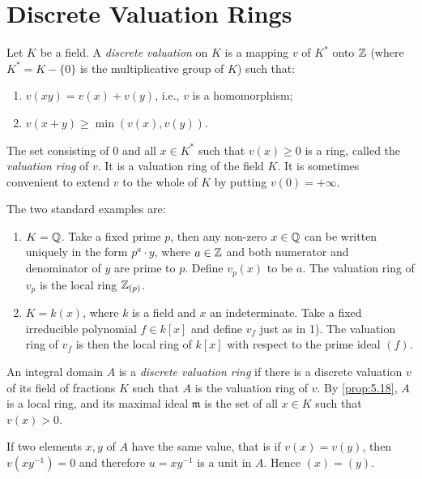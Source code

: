 \section*{Discrete Valuation Rings}
Let $K$ be a field. A \emph{discrete valuation} on $K$ is a mapping $v$ of $K^*$ onto $\mathbb{Z}$ (where $K^* = K - \{0\}$ is the multiplicative group of $K$) such that:
\begin{enumerate}[1)]
    \item $v(xy) = v(x) + v(y)$, i.e., $v$ is a homomorphism;
    \item $v(x + y) \geq \min(v(x), v(y))$.
\end{enumerate}

The set consisting of $0$ and all $x \in K^*$ such that $v(x) \geq 0$ is a ring, called the \emph{valuation ring} of $v$. It is a valuation ring of the field $K$. It is sometimes convenient to extend $v$ to the whole of $K$ by putting $v(0) = +\infty$.

\begin{examples}
The two standard examples are:
\begin{enumerate}[1)]
    \item $K = \mathbb{Q}$. Take a fixed prime $p$, then any non-zero $x \in \mathbb{Q}$ can be written uniquely in the form $p^a \cdot y$, where $a \in \mathbb{Z}$ and both numerator and denominator of $y$ are prime to $p$. Define $v_p(x)$ to be $a$. The valuation ring of $v_p$ is the local ring $\mathbb{Z}_{(p)}$.
    
    \item $K = k(x)$, where $k$ is a field and $x$ an indeterminate. Take a fixed irreducible polynomial $f \in k[x]$ and define $v_f$ just as in 1). The valuation ring of $v_f$ is then the local ring of $k[x]$ with respect to the prime ideal $(f)$.
\end{enumerate}
\end{examples}

An integral domain $A$ is a \emph{discrete valuation ring} if there is a discrete valuation $v$ of its field of fractions $K$ such that $A$ is the valuation ring of $v$. By \eqref{prop:5.18}, $A$ is a local ring, and its maximal ideal $\mathfrak{m}$ is the set of all $x \in K$ such that $v(x) > 0$.

If two elements $x, y$ of $A$ have the same value, that is if $v(x) = v(y)$, then $v(xy^{-1}) = 0$ and therefore $u = xy^{-1}$ is a unit in $A$. Hence $(x) = (y)$.

